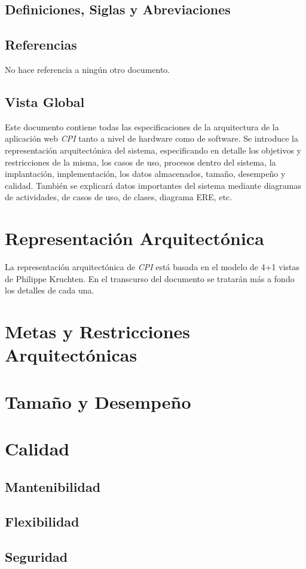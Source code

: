 \documentclass{article}
\begin{document}
    \subsection{Definiciones, Siglas y Abreviaciones}

    \subsection{Referencias}
    No hace referencia a ningún otro documento.

    \subsection{Vista Global}
    Este documento contiene todas las especificaciones de la arquitectura de la aplicación web \emph{CPI} tanto a nivel de hardware como de software. Se introduce la representación arquitectónica del sistema, especificando en detalle los objetivos y restricciones de la misma, los casos de uso, procesos dentro del sistema, la implantación, implementación, los datos almacenados, tamaño, desempeño y calidad. También se explicará datos importantes del sistema mediante diagramas de actividades, de casos de uso, de clases, diagrama ERE, etc.


    \section{Representación Arquitectónica} \label{reprArq}
    La representación arquitectónica de \emph{CPI} está basada en el modelo de 4+1 vistas de Philippe Kruchten. En el transcurso del documento se tratarán más a fondo los detalles de cada una.
    
    \section{Metas y Restricciones Arquitectónicas} \label{metasArq}

    
    
    
    
    

    \section{Tamaño y Desempeño} \label{tamDesemp}

    \section{Calidad}
    \subsection{Mantenibilidad}
    \subsection{Flexibilidad}
    \subsection{Seguridad}
\end{document}
